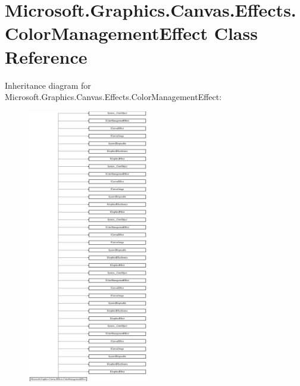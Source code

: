\hypertarget{class_microsoft_1_1_graphics_1_1_canvas_1_1_effects_1_1_color_management_effect}{}\section{Microsoft.\+Graphics.\+Canvas.\+Effects.\+Color\+Management\+Effect Class Reference}
\label{class_microsoft_1_1_graphics_1_1_canvas_1_1_effects_1_1_color_management_effect}
Inheritance diagram for Microsoft.\+Graphics.\+Canvas.\+Effects.\+Color\+Management\+Effect\+:\begin{figure}[H]
\begin{center}
\leavevmode
\includegraphics[height=12.000000cm]{class_microsoft_1_1_graphics_1_1_canvas_1_1_effects_1_1_color_management_effect}
\end{center}
\end{figure}
